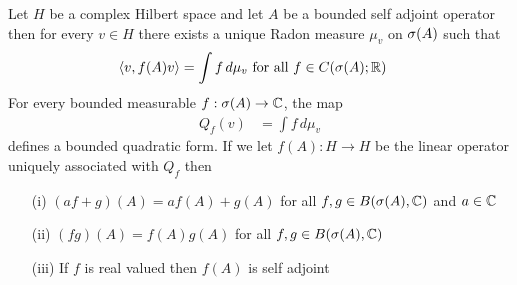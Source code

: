 \begin{prop}\label{hilbert:BoundedMeasurableFunctionalCalculusBoundedSelfAdjoint}Let $H$ be a complex Hilbert space and let $A$ be a bounded self adjoint operator then for every $v \in H$ there exists a unique Radon measure $\mu_v$ on $\sigma(A)$ such that 
\begin{align*}
\langle v, f(A) v \rangle &= \int f \, d\mu_v \text{ for all $f \in C(\sigma(A); \mathbb{R})$}
\end{align*}
For every bounded measurable $f : \sigma(A) \to \mathbb{C}$, the map 
\begin{align*}
Q_f(v) &= \int f \, d\mu_v
\end{align*}
defines a bounded quadratic form.  If we let $f(A) : H \to H$ be the linear operator uniquely associated with $Q_f$ then  
\begin{itemize}
\item[(i)] $(af + g)(A) = af(A) + g(A)$ for all $f,g \in B(\sigma(A), \mathbb{C})$ and $a \in \mathbb{C}$
\item[(ii)] $(fg)(A) = f(A) g(A)$ for all $f,g \in B(\sigma(A), \mathbb{C})$
\item[(iii)] If $f$ is real valued then $f(A)$ is self adjoint
\end{itemize}
\end{prop}
